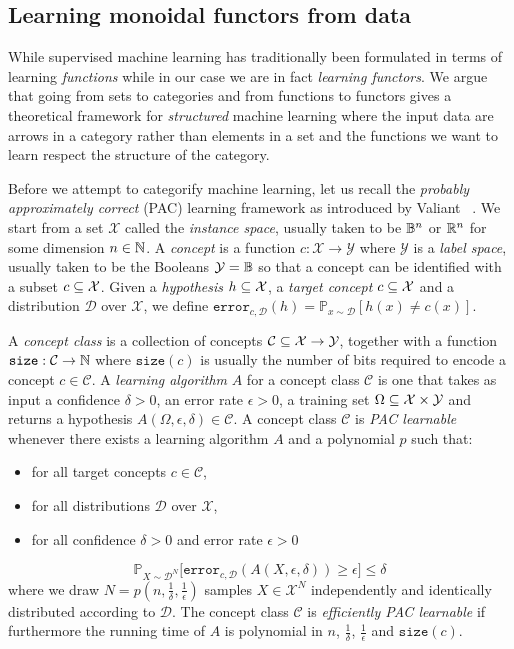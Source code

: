 
\subsection{Learning monoidal functors from data}

While supervised machine learning has traditionally been formulated in terms of learning \emph{functions} while in our case we are in fact \emph{learning functors}.
We argue that going from sets to categories and from functions to functors gives a theoretical framework for \emph{structured} machine learning where the input data are arrows in a category rather than elements in a set and the functions we want to learn respect the structure of the category.

Before we attempt to categorify machine learning, let us recall the \emph{probably approximately correct} (PAC) learning framework as introduced by Valiant~\cite{Valiant84} .
We start from a set $\mathcal{X}$ called the \emph{instance space}, usually taken to be $\mathbb{B}^n$ or $\mathbb{R}^n$ for some dimension $n \in \mathbb{N}$.
A \emph{concept} is a function $c : \mathcal{X} \to \mathcal{Y}$ where $\mathcal{Y}$ is a \emph{label space}, usually taken to be the Booleans $\mathcal{Y} = \mathbb{B}$ so that a concept can be identified with a subset $c \subseteq \mathcal{X}$.
Given a \emph{hypothesis} $h \subseteq \mathcal{X}$, a \emph{target concept} $c \subseteq \mathcal{X}$ and a distribution $\mathcal{D}$ over $\mathcal{X}$, we define $\mathtt{error}_{c, \mathcal{D}}(h) = \mathbb{P}_{x \sim \mathcal{D}} [ h(x) \neq c(x) ]$.

A \emph{concept class} is a collection of concepts $\mathcal{C} \subseteq \mathcal{X} \to \mathcal{Y}$, together with a function $\mathtt{size} : \mathcal{C} \to \mathbb{N}$ where $\mathtt{size}(c)$ is usually the number of bits required to encode a concept $c \in \mathcal{C}$.
A \emph{learning algorithm} $A$ for a concept class $\mathcal{C}$ is one that takes as input a confidence $\delta > 0$, an error rate $\epsilon > 0$, a training set $\Omega \subseteq \mathcal{X} \times \mathcal{Y}$ and returns a hypothesis $A(\Omega, \epsilon, \delta) \in \mathcal{C}$.
A concept class $\mathcal{C}$ is \emph{PAC learnable} whenever there exists a learning algorithm $A$ and a polynomial $p$ such that:
\begin{itemize}
    \item for all target concepts $c \in \mathcal{C}$,
    \item for all distributions $\mathcal{D}$ over $\mathcal{X}$,
    \item for all confidence $\delta > 0$ and error rate $\epsilon > 0$
\end{itemize}
$$\mathbb{P}_{X \sim \mathcal{D}^N}\big[ \mathtt{error}_{c, \mathcal{D}}(A(X, \epsilon, \delta)) \geq \epsilon \big] \leq \delta$$
where we draw $N = p(n, \frac{1}{\delta}, \frac{1}{\epsilon})$ samples $X \in \mathcal{X}^N$ independently and identically distributed according to $\mathcal{D}$.
The concept class $\mathcal{C}$ is \emph{efficiently PAC learnable} if furthermore the running time of $A$ is polynomial in $n$, $\frac{1}{\delta}$, $\frac{1}{\epsilon}$ and $\mathtt{size}(c)$.

